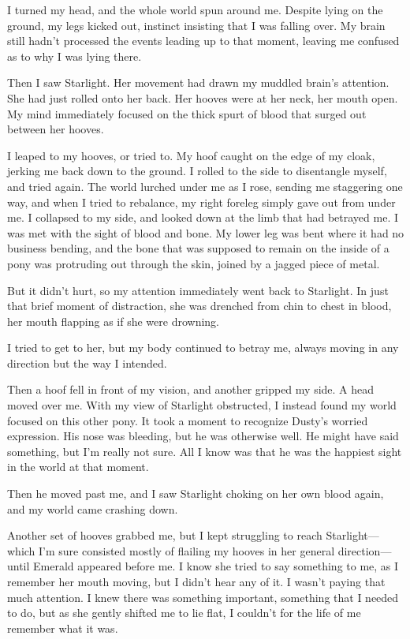 I turned my head, and the whole world spun around me. Despite lying on the ground, my legs kicked out, instinct insisting that I was falling over. My brain still hadn’t processed the events leading up to that moment, leaving me confused as to why I was lying there.

Then I saw Starlight. Her movement had drawn my muddled brain’s attention. She had just rolled onto her back. Her hooves were at her neck, her mouth open. My mind immediately focused on the thick spurt of blood that surged out between her hooves.

I leaped to my hooves, or tried to. My hoof caught on the edge of my cloak, jerking me back down to the ground. I rolled to the side to disentangle myself, and tried again. The world lurched under me as I rose, sending me staggering one way, and when I tried to rebalance, my right foreleg simply gave out from under me. I collapsed to my side, and looked down at the limb that had betrayed me. I was met with the sight of blood and bone. My lower leg was bent where it had no business bending, and the bone that was supposed to remain on the inside of a pony was protruding out through the skin, joined by a jagged piece of metal.

But it didn’t hurt, so my attention immediately went back to Starlight. In just that brief moment of distraction, she was drenched from chin to chest in blood, her mouth flapping as if she were drowning.

I tried to get to her, but my body continued to betray me, always moving in any direction but the way I intended.

Then a hoof fell in front of my vision, and another gripped my side. A head moved over me. With my view of Starlight obstructed, I instead found my world focused on this other pony. It took a moment to recognize Dusty’s worried expression. His nose was bleeding, but he was otherwise well. He might have said something, but I’m really not sure. All I know was that he was the happiest sight in the world at that moment.

Then he moved past me, and I saw Starlight choking on her own blood again, and my world came crashing down.

Another set of hooves grabbed me, but I kept struggling to reach Starlight—which I’m sure consisted mostly of flailing my hooves in her general direction—until Emerald appeared before me. I know she tried to say something to me, as I remember her mouth moving, but I didn’t hear any of it. I wasn’t paying that much attention. I knew there was something important, something that I needed to do, but as she gently shifted me to lie flat, I couldn’t for the life of me remember what it was.

